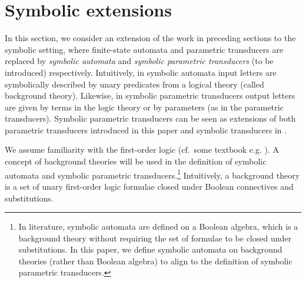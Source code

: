 
\section{Symbolic extensions}
\label{sec:symbolic}

In this section, we consider an extension of the work in preceding sections to the symbolic setting, where finite-state automata and parametric transducers are replaced by \emph{symbolic automata} \cite{NG01,DV14} and \emph{symbolic parametric transducers} (to be introduced) respectively.
%
Intuitively, in symbolic automata %
input letters are symbolically described by unary predicates from a logical theory (called background theory). %
%
Likewise, in symbolic parametric transducers %
output letters are given by terms in the logic theory or by parameters (as in the parametric transducers).
Symbolic parametric transducers can be seen as extensions of both parametric
transducers introduced in this paper and symbolic transducers in
\cite{symbolic-transducer}.


We assume familiarity with the %
first-order logic (cf.\ some textbook e.g. \cite{EFT94}). A concept of background theories will be used in the definition of symbolic automata and symbolic parametric transducers.\footnote{In literature, symbolic automata are defined on a Boolean algebra, which is a background theory without requiring the set of formulae to be closed under substitutions. In this paper, we define symbolic automata on background theories (rather than Boolean algebra) to align to the definition of symbolic parametric transducers.}
Intuitively, 
a background theory is a set of unary first-order logic formulae closed under Boolean connectives and substitutions. 
 
